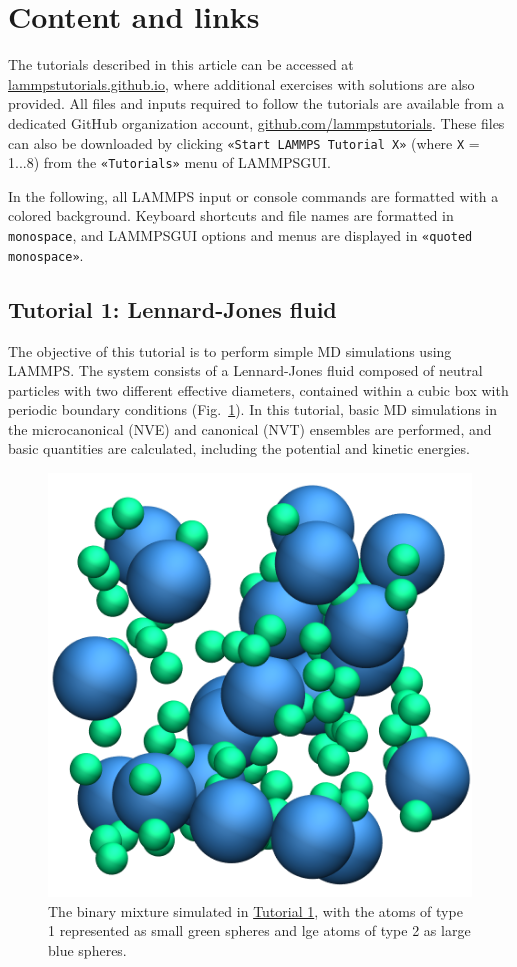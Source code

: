 \documentclass[9pt,tutorial]{livecoms}
\newcommand{\lmpcmd}[1]{\hspace{0pt}\colorbox{listing}{\textcolor{command}{\small{#1}}}\hspace{0pt}} %
\newcommand{\flecmd}[1]{\textcolor{command}{\texttt{#1}}} %
\newcommand{\guicmd}[1]{\textcolor{command}{\texttt{«#1»}}} %
\newcommand{\lammpsgui}{\textsf{LAMMPS\textendash GUI}}
\begin{document}
\section{Content and links}

The tutorials described in this article can be accessed at
\href{https://lammpstutorials.github.io}{lammpstutorials.github.io},
where additional exercises with solutions are also provided.  All files
and inputs required to follow the tutorials are available from a
dedicated GitHub organization account,
\href{https://github.com/lammpstutorials}{github.com/lammpstutorials}.
These files can also be downloaded by clicking \guicmd{Start LAMMPS Tutorial X}
(where \texttt{X} = 1...8) from the \guicmd{Tutorials} menu of \lammpsgui{}.

In the following, all LAMMPS input or console commands are formatted
with a \lmpcmd{colored background}.  Keyboard shortcuts and
file names are formatted in \flecmd{monospace}, and \lammpsgui{} options and menus
are displayed in \guicmd{quoted monospace}.

\subsection{Tutorial 1: Lennard-Jones fluid}
\label{lennard-jones-label}

The objective of this tutorial is to perform simple MD simulations
using LAMMPS.  The system consists of a Lennard-Jones fluid composed of
neutral particles with two different effective diameters, contained
within a cubic box with periodic boundary conditions
(Fig.~\ref{fig:LJ-avatar}).  In this tutorial, basic MD simulations in
the microcanonical (NVE) and canonical (NVT) ensembles are performed,
and basic quantities are calculated, including the potential and kinetic
energies.

\begin{figure}
\centering
\includegraphics[width=0.65\linewidth]{LJ-avatar}
\caption{The binary mixture simulated in
  \hyperref[lennard-jones-label]{Tutorial 1}, with the atoms of type 1
  represented as small green spheres and lge atoms of type 2 as large
  blue spheres.}
\label{fig:LJ-avatar}
\end{figure}
\end{document}
